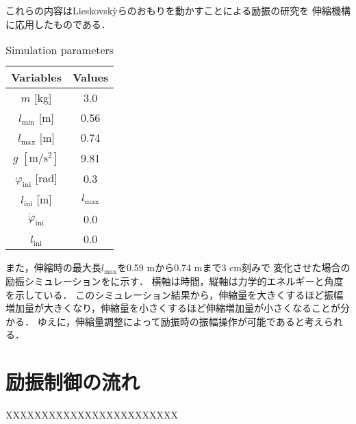           これらの内容はLieskovsk{\`y}らのおもりを動かすことによる励振の研究\cite{lieskovsky2023optimal}を
          伸縮機構に応用したものである．
          \begin{table}[tb]
            \begin{center}
              \caption{Simulation parameters}
              \vspace{2mm}
              \begin{tabular}{c|c}
                \hline
                Variables & Values \\
                \hline
                $m$ [kg] & 3.0 \\
                $l_{\mathrm{min}}$ [m] & 0.56 \\
                $l_{\mathrm{max}}$ [m] & 0.74 \\
                $g$ $\mathrm{[m/s^2]}$ & 9.81 \\
                $\varphi_{\mathrm{ini}}$ [rad] & 0.3 \\
                $l_{\mathrm{ini}}$ [m]& $l_{\mathrm{max}}$ \\
                $\dot{\varphi}_{\mathrm{ini}}$ & 0.0 \\
                $\dot{l}_{\mathrm{ini}}$ & 0.0 \\
                \hline
              \end{tabular}
            \end{center}
          \end{table}
          
          また，伸縮時の最大長$l_{\mathrm{max}}$を0.59 mから0.74 mまで3 cm刻みで
          変化させた場合の励振シミュレーションをに示す．
          横軸は時間，縦軸は力学的エネルギーと角度を示している．
          このシミュレーション結果から，伸縮量を大きくするほど振幅増加量が大きくなり，伸縮量を小さくするほど伸縮増加量が小さくなることが分かる．
          ゆえに，伸縮量調整によって励振時の振幅操作が可能であると考えられる．
              
        \section{励振制御の流れ}
          

          XXXXXXXXXXXXXXXXXXXXXXXX
          
